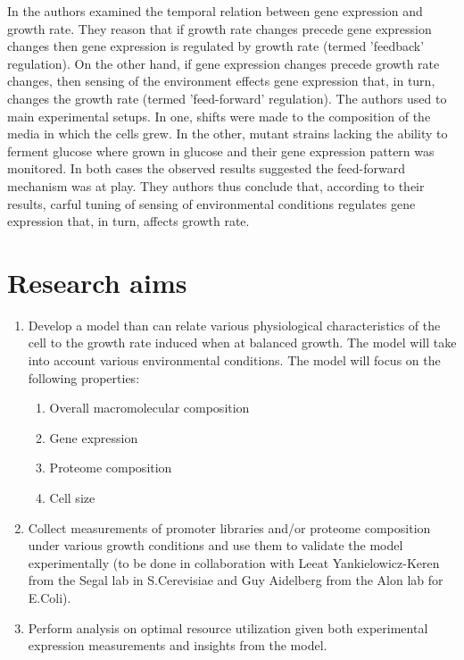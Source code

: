 \documentclass{report}
\begin{document}
In \cite{Levy2009} the authors examined the temporal relation between gene expression and growth rate.
They reason that if growth rate changes precede gene expression changes then gene expression is regulated by growth rate (termed 'feedback' regulation).
On the other hand, if gene expression changes precede growth rate changes, then sensing of the environment effects gene expression that, in turn, changes the growth rate (termed 'feed-forward' regulation).
The authors used to main experimental setups.
In one, shifts were made to the composition of the media in which the cells grew.
In the other, mutant strains lacking the ability to ferment glucose where grown in glucose and their gene expression pattern was monitored.
In both cases the observed results suggested the feed-forward mechanism was at play.
They authors thus conclude that, according to their results, carful tuning of sensing of environmental conditions regulates gene expression that, in turn, affects growth rate.
\section{Research aims}
\begin{enumerate}
\item Develop a model than can relate various physiological characteristics of the cell to the growth rate induced when at balanced growth.
The model will take into account various environmental conditions.
The model will focus on the following properties:
\begin{enumerate}
\item Overall macromolecular composition
\item Gene expression
\item Proteome composition
\item Cell size
\end{enumerate}
\item Collect measurements of promoter libraries and/or proteome composition under various growth conditions and use them to validate the model experimentally (to be done in collaboration with Leeat Yankielowicz-Keren from the Segal lab in S.Cerevisiae and Guy Aidelberg from the Alon lab for E.Coli).
\item Perform analysis on optimal resource utilization given both experimental expression measurements and insights from the model.
\end{enumerate}
\end{document}
